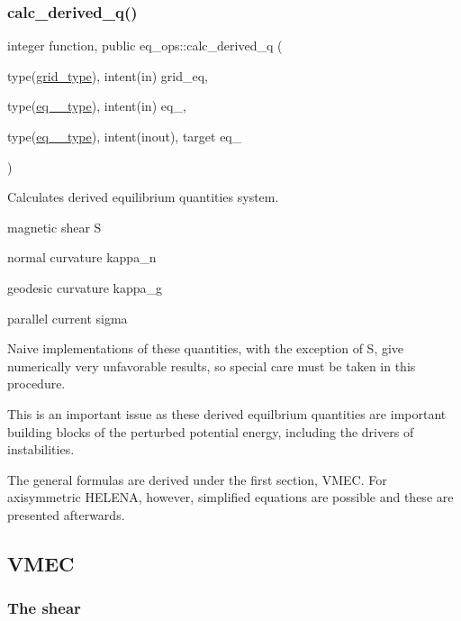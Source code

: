 \subsubsection{\texorpdfstring{calc\+\_\+derived\+\_\+q()}{calc\_derived\_q()}}
{\footnotesize\ttfamily integer function, public eq\+\_\+ops\+::calc\+\_\+derived\+\_\+q (\begin{DoxyParamCaption}\item[{type(\hyperlink{structgrid__vars_1_1grid__type}{grid\+\_\+type}), intent(in)}]{grid\+\_\+eq,  }\item[{type(\hyperlink{structeq__vars_1_1eq__1__type}{eq\+\_\+1\+\_\+type}), intent(in)}]{eq\+\_,  }\item[{type(\hyperlink{structeq__vars_1_1eq__2__type}{eq\+\_\+2\+\_\+type}), intent(inout), target}]{eq\+\_ }\end{DoxyParamCaption})}



Calculates derived equilibrium quantities system. 


\begin{DoxyItemize}
\item magnetic shear {\ttfamily S} 
\item normal curvature {\ttfamily kappa\+\_\+n} 
\item geodesic curvature {\ttfamily kappa\+\_\+g} 
\item parallel current {\ttfamily sigma} 
\end{DoxyItemize}

Naive implementations of these quantities, with the exception of {\ttfamily S}, give numerically very unfavorable results, so special care must be taken in this procedure.

This is an important issue as these derived equilbrium quantities are important building blocks of the perturbed potential energy, including the drivers of instabilities.

The general formulas are derived under the first section, V\+M\+EC. For axisymmetric H\+E\+L\+E\+NA, however, simplified equations are possible and these are presented afterwards.

\subsection*{V\+M\+EC }

\subsubsection*{The shear }

